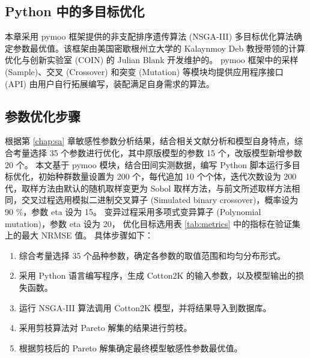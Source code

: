 \subsection{Python 中的多目标优化}
本章采用 pymoo 框架提供的非支配排序遗传算法 (NSGA-III) 多目标优化算法确定参数最优值。该框架由美国密歇根州立大学的 Kalaynmoy Deb 教授带领的计算优化与创新实验室 (COIN) 的 Julian Blank 开发维护的。%
pymoo 框架中的采样 (Sample)、交叉 (Crossover) 和突变 (Mutation) 等模块均提供应用程序接口 (API) 由用户自行拓展编写，装配满足自身需求的算法。%

\subsection{参数优化步骤}
根据第 \ref{chap:sa} 章敏感性参数分析结果，结合相关文献分析和模型自身特点，综合考量选择 35 个参数进行优化，其中原版模型的参数 15 个，改版模型新增参数 20 个。
本文基于 pymoo 模块，结合田间实测数据，编写 Python 脚本运行多目标优化，初始种群数量设置为 200 个，每代追加 10 个个体，迭代次数设为 200 代，取样方法由默认的随机取样变更为
Sobol 取样方法，与前文所述取样方法相同，交叉过程选用模拟二进制交叉算子 (Simulated binary crossover)，概率设为 90 \%，参数 eta 设为 15。%
变异过程采用多项式变异算子 (Polynomial mutation)，参数 eta 设为 20，%
优化目标选用表 \ref{tab:metrics} 中的指标在验证集上的最大 NRMSE 值。
具体步骤如下：
\begin{enumerate}
    \item 综合考量选择 35 个品种参数，确定各参数的取值范围和均匀分布形式。
    \item 采用 Python 语言编写程序，生成 Cotton2K 的输入参数，以及模型输出的损失函数。
    \item 运行 NSGA-III 算法调用 Cotton2K 模型，并将结果导入到数据库。
    \item 采用剪枝算法对 Pareto 解集的结果进行剪枝。
    \item 根据剪枝后的 Pareto 解集确定最终模型敏感性参数最优值。
\end{enumerate}


